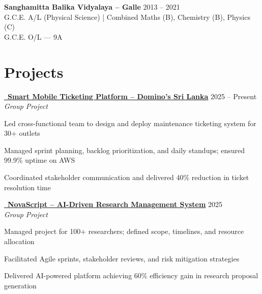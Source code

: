 \documentclass[letterpaper,10.8pt]{article}
\newenvironment{resume_list}{
  \vspace{-1pt}
  \begin{itemize}[itemsep=2pt, leftmargin=14pt]
}{
  \end{itemize}\vspace{-2pt}
}
\begin{document}
\vspace{2pt}
\noindent\textbf{Sanghamitta Balika Vidyalaya – Galle} \hfill 2013 – 2021\\
G.C.E. A/L (Physical Science) | Combined Maths (B), Chemistry (B), Physics (C)\\
\noindent G.C.E. O/L — 9A

\section{Projects}
\vspace{-2pt}

\newcommand{\project}[5]{%
  \noindent
  \href{#1}{\faGithub~\textbf{#2}} \hfill #3\\[-1pt]
  \textit{#4}\\[-5pt]
  \begin{resume_list}
    #5
  \end{resume_list}
  \vspace{4pt}
}

\project{https://github.com/fixpoint-tech}
{Smart Mobile Ticketing Platform – Domino's Sri Lanka}
{2025 – Present}
{Group Project}{
  \item Led cross-functional team to design and deploy maintenance ticketing system for 30+ outlets
  \item Managed sprint planning, backlog prioritization, and daily standups; ensured 99.9\% uptime on AWS
  \item Coordinated stakeholder communication and delivered 40\% reduction in ticket resolution time
}

\vspace{8pt}

\project{https://github.com/Chandima0406/NovaScript.git}
{NovaScript – AI-Driven Research Management System}
{2025}
{Group Project}{
  \item Managed project for 100+ researchers; defined scope, timelines, and resource allocation
  \item Facilitated Agile sprints, stakeholder reviews, and risk mitigation strategies
  \item Delivered AI-powered platform achieving 60\% efficiency gain in research proposal generation
}

\vspace{8pt}
\end{document}
